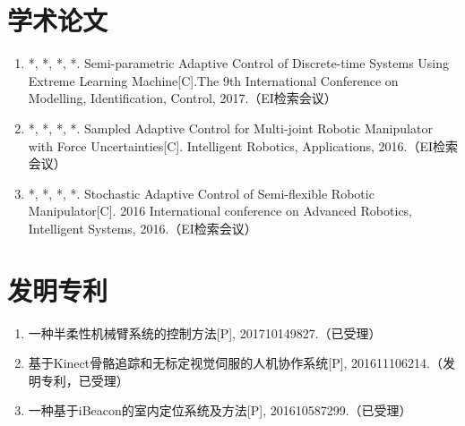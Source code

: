 
\begin{publications}{99}
\section*{学术论文}
\begin{enumerate}%
\item *, *, *, *. Semi-parametric Adaptive Control of Discrete-time Systems Using Extreme Learning Machine[C].The 9th International Conference on Modelling, Identification, Control, 2017.（EI检索会议）
\item *, *, *, *. Sampled Adaptive Control for Multi-joint Robotic Manipulator with Force Uncertainties[C]. Intelligent Robotics, Applications, 2016.（EI检索会议）
\item *, *, *, *. Stochastic Adaptive Control of Semi-flexible Robotic Manipulator[C]. 2016 International conference on Advanced Robotics, Intelligent Systems, 2016.（EI检索会议）
\end{enumerate}

\section*{发明专利}
\begin{enumerate}%
\item 一种半柔性机械臂系统的控制方法[P], 201710149827.（已受理）
\item 基于Kinect骨骼追踪和无标定视觉伺服的人机协作系统[P], 201611106214.（发明专利，已受理）
\item 一种基于iBeacon的室内定位系统及方法[P], 201610587299.（已受理）
\end{enumerate}
\end{publications}
